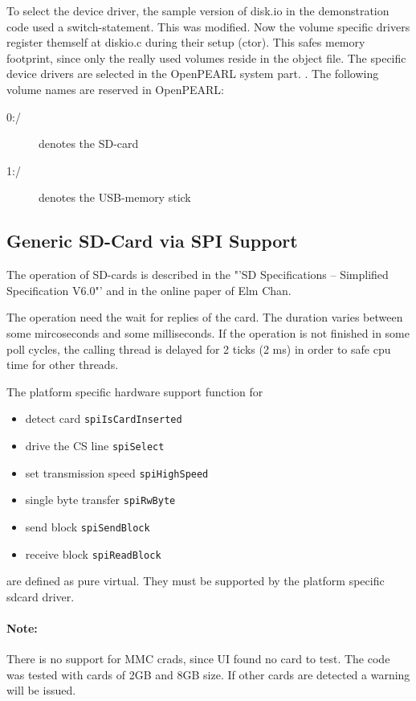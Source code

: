 To select the device driver, the sample version of disk.io 
in the demonstration code  used a switch-statement.
This was modified. Now the volume specific
drivers register themself at diskio.c during their setup (ctor).
This safes memory footprint, since only the really used volumes reside in
the object file.
The specific device drivers are selected in the OpenPEARL system part.
.
The following volume names are reserved in OpenPEARL:
\begin{description}
\item[0:/] denotes the SD-card
\item[1:/] denotes the USB-memory stick
\end{description}

\subsection{Generic SD-Card via SPI Support}
\label{sec:SDCardSpi}
The operation of SD-cards is described in the "'SD Specifications -- 
Simplified Specification V6.0"' and in the online paper of
Elm Chan.

The operation need the wait for replies of the card. The duration
varies between some mircoseconds and some milliseconds. If the 
operation is not finished in some poll cycles, the calling thread 
is delayed for 2 ticks (2 ms) in order to safe cpu time for other threads.

The platform specific hardware support function for
\begin{itemize}
\item detect card \verb|spiIsCardInserted|
\item drive the CS line \verb|spiSelect|
\item set transmission speed \verb|spiHighSpeed|
\item single byte transfer \verb|spiRwByte|
\item send block \verb|spiSendBlock|
\item receive block \verb|spiReadBlock|
\end{itemize}
are defined as pure virtual. They must be supported by the platform specific 
sdcard driver.


\paragraph{Note:} There is no support for MMC crads, since UI found no card
to test. The code was tested with cards of 2GB and 8GB size.
If other cards are detected a warning will be issued.

